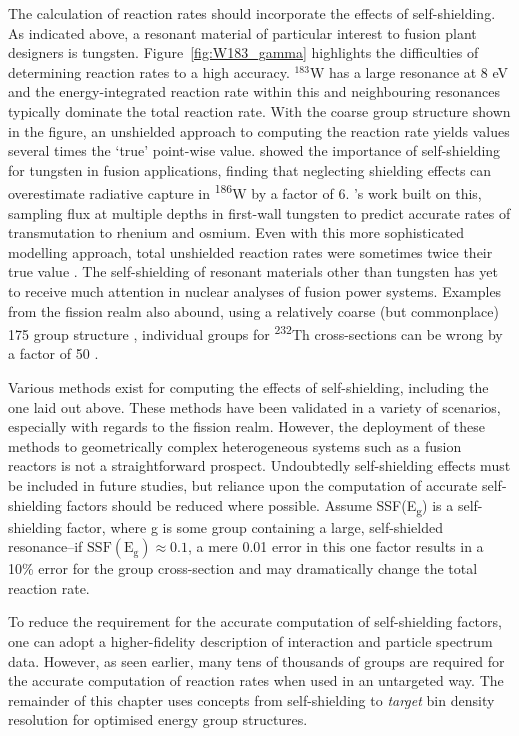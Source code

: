 The calculation of reaction rates should incorporate the effects of self-shielding. As indicated above, a resonant material of particular interest to fusion plant designers is tungsten. Figure~\ref{fig:W183_gamma} highlights the difficulties of determining reaction rates to a high accuracy. $^{183}$W has a large resonance at 8 eV and the energy-integrated reaction rate within this and neighbouring resonances typically dominate the total reaction rate. With the coarse group structure shown in the figure, an unshielded approach to computing the reaction rate yields values several times the `true' point-wise value. \citeauthor{Pampin2005} showed the importance of self-shielding for tungsten in fusion applications, finding that neglecting shielding effects can overestimate radiative capture in \textsuperscript{186}W by a factor of 6. \citeauthor{Gilbert2016}'s work built on this, sampling flux at multiple depths in first-wall tungsten to predict accurate rates of transmutation to rhenium and osmium. Even with this more sophisticated modelling approach, total unshielded reaction rates were sometimes twice their true value \cite{Gilbert2016}. The self-shielding of resonant materials other than tungsten has yet to receive much attention in nuclear analyses of fusion power systems. Examples from the fission realm also abound, using a relatively coarse (but commonplace) 175 group structure \cite{Plechaty1978}, individual groups for \textsuperscript{232}Th cross-sections can be wrong by a factor of 50 \cite{Cacuci2010}. 

Various methods exist for computing the effects of self-shielding, including the one laid out above. These methods have been validated in a variety of scenarios, especially with regards to the fission realm. However, the deployment of these methods to geometrically complex heterogeneous systems such as a fusion reactors is not a straightforward prospect. Undoubtedly self-shielding effects must be included in future studies, but reliance upon the computation of accurate self-shielding factors should be reduced where possible. Assume SSF(E\textsubscript{g}) is a self-shielding factor, where g is some group containing a large, self-shielded resonance--if $\mathrm{SSF(E_{g})} \approx 0.1$, a mere 0.01 error in this one factor results in a 10\% error for the group cross-section and may dramatically change the total reaction rate. 

To reduce the requirement for the accurate computation of self-shielding factors, one can adopt a higher-fidelity description of interaction and particle spectrum data. However, as seen earlier, many tens of thousands of groups are required for the accurate computation of reaction rates when used in an untargeted way. The remainder of this chapter uses concepts from self-shielding to \textit{target} bin density resolution for optimised energy group structures. 

